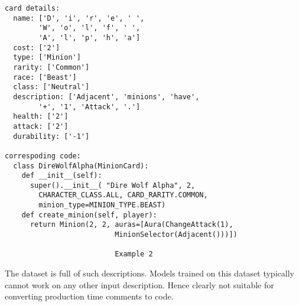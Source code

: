 \documentclass{IEEEtran}
\begin{document}
      \begin{lstlisting}[frame=single,basicstyle=\scriptsize]
card details:
  name: ['D', 'i', 'r', 'e', ' ', 
        'W', 'o', 'l', 'f', ' ', 
        'A', 'l', 'p', 'h', 'a']
  cost: ['2']
  type: ['Minion']
  rarity: ['Common']
  race: ['Beast']
  class: ['Neutral']
  description: ['Adjacent', 'minions', 'have', 
        '+', '1', 'Attack', '.']
  health: ['2']
  attack: ['2']
  durability: ['-1']

correspoding code:
  class DireWolfAlpha(MinionCard):
    def __init__(self):
      super().__init__( "Dire Wolf Alpha", 2, 
        CHARACTER_CLASS.ALL, CARD_RARITY.COMMON, 
        minion_type=MINION_TYPE.BEAST)
    def create_minion(self, player):
      return Minion(2, 2, auras=[Aura(ChangeAttack(1), 
                          MinionSelector(Adjacent()))])

                          Example 2
      \end{lstlisting}

      The dataset is full of such descriptions. Models trained on this dataset
      typically cannot work on any other input description. Hence clearly not
      suitable for converting production time comments to code.
\end{document}
